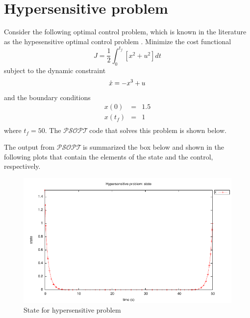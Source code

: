 \documentclass[a4paper,11pt]{report}    %
\newcommand{\psopt}{$\mathcal{PSOPT}$\,}  %
\newenvironment{shadedframe}{%
  \def\FrameCommand{\fcolorbox{black}{shadecolor}}%
  \MakeFramed {\FrameRestore}}
{\endMakeFramed}
\begin{document}
\section{Hypersensitive problem}

Consider the following optimal control problem, which is known in the literature
as the hypesensitive optimal control problem \cite{Rao:00}.  Minimize the cost functional
\begin{equation}
  J = \frac{1}{2} \int_0^{t_f} [ x^2 + u^2 ] dt
\end{equation}
subject to the dynamic constraint
\begin{equation}
    \dot x  =  -x^3 + u \\
\end{equation}
and the boundary conditions
\begin{equation}
  \begin{array}{lcl}
    x(0) & = & 1.5 \\
    x(t_f) & = & 1 \\
  \end{array}
\end{equation}
where $t_f=50$. The
\psopt code that solves this problem is shown below.  

\tiny
\begin{shadedframe}

\end{shadedframe}
\normalsize
The output from \psopt is summarized the box below and shown in the following plots that contain the elements
of the state and the control, respectively.

\begin{shadedframe}

\end{shadedframe}



\begin{figure}
  \centering
  \includegraphics{../examples/hyper/hyper_state}
  \caption{State for hypersensitive problem}
\end{figure}
\end{document}

